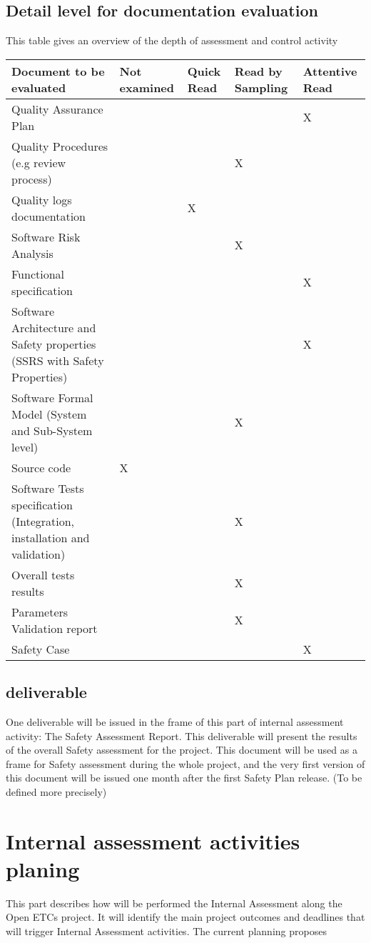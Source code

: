 \documentclass{template/openetcs_article}
\begin{document}
\subsection{Detail level for documentation evaluation}

This table gives an overview of the depth of assessment and control activity

\begin{tabular}{|p{5cm}|p{2cm}|p{2cm}|p{2cm}|p{2cm}|} 
\hline
\textbf{Document to be evaluated} & \textbf{Not examined} & \textbf{Quick Read} & \textbf{Read by Sampling} & \textbf{Attentive Read} \\ \hline
Quality Assurance Plan & & & & X \\ \hline
Quality Procedures (e.g review process) & & & X & \\ \hline
Quality logs documentation & & X & & \\ \hline
Software Risk Analysis & & & X & \\ \hline
Functional specification & & & & X \\ \hline
Software Architecture and Safety properties (SSRS with Safety Properties) & & & & X \\ \hline
Software Formal Model (System and Sub-System level) & & & X & \\ \hline
Source code & X & & & \\ \hline
Software Tests specification (Integration, installation and validation) & & & X & \\ \hline
Overall tests results & & & X & \\ \hline
Parameters Validation report & & & X & \\ \hline
Safety Case & & & & X \\ \hline
\end{tabular}



\subsection{deliverable}
One deliverable will be issued in the frame of this part of internal assessment activity: The Safety Assessment Report. This deliverable will present the results of the overall Safety assessment for the project.
This document will be used as a frame for Safety assessment during the whole project, and the very first version of this document will be issued one month after the first Safety Plan release. (To be defined more precisely)

\section{Internal assessment activities planing}
This part describes how will be performed the Internal Assessment along the Open ETCs project. It will identify the main project outcomes and deadlines that will trigger Internal Assessment activities.
The current planning proposes

\end{document}

